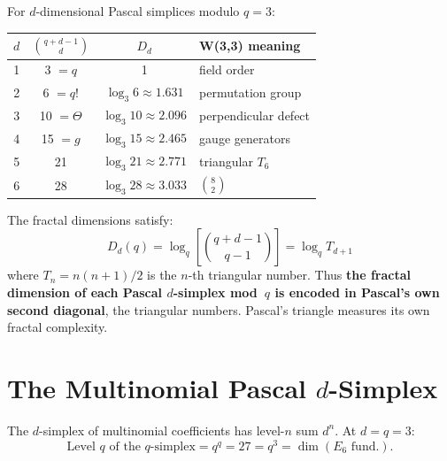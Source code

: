 \begin{theorem}[Fractal Dimension Sequence at $q=3$]
\label{thm:fractal-sequence}
For $d$-dimensional Pascal simplices modulo $q=3$:
\begin{center}
\begin{tabular}{@{}cccl@{}}
\toprule
$d$ & $\binom{q+d-1}{d}$ & $D_d$ & W(3,3) meaning \\
\midrule
1 & 3 $= q$ & 1 & field order \\
2 & 6 $= q!$ & $\log_3 6 \approx 1.631$ & permutation group \\
3 & 10 $= \Theta$ & $\log_3 10 \approx 2.096$ & perpendicular defect \\
4 & 15 $= g$ & $\log_3 15 \approx 2.465$ & gauge generators \\
5 & 21 & $\log_3 21 \approx 2.771$ & triangular $T_6$ \\
6 & 28 & $\log_3 28 \approx 3.033$ & $\binom{8}{2}$ \\
\bottomrule
\end{tabular}
\end{center}
\end{theorem}

\begin{theorem}
\label{thm:pascal-self-ref}
The fractal dimensions satisfy:
\begin{equation}
\boxed{
D_d(q) = \log_q\left[\binom{q+d-1}{q-1}\right] = \log_q T_{d+1}
}
\end{equation}
where $T_n = n(n+1)/2$ is the $n$-th triangular number.
Thus \textbf{the fractal dimension of each Pascal $d$-simplex mod~$q$
is encoded in Pascal's own second diagonal}, the triangular numbers.
Pascal's triangle measures its own fractal complexity.
\end{theorem}


\section{\texorpdfstring{The Multinomial Pascal $d$-Simplex}{The Multinomial Pascal d-Simplex}}
\label{sec:multinomial}

The $d$-simplex of multinomial coefficients has level-$n$ sum $d^n$.
At $d=q=3$:
\begin{equation}
\text{Level } q \text{ of the } q\text{-simplex} = q^q = 27 = q^3 = \dim(E_6\text{ fund.}).
\end{equation}

